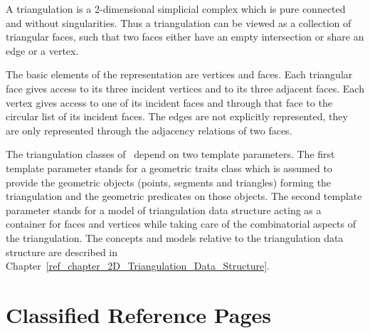 

A triangulation is a 2-dimensional simplicial complex which is pure
connected and without singularities. Thus a triangulation
can be viewed as a collection of triangular faces,
such that two faces either have an empty intersection or share an edge or a vertex.

The basic elements of the representation are vertices and faces.
Each triangular face gives access to its three incident vertices 
and to its three adjacent faces. 
Each vertex gives access to one of its incident faces
and through that face to the circular list of its incident faces.
The edges are not explicitly represented, they are only represented 
through the adjacency relations of two faces.

The triangulation classes of \cgal\ depend on two template parameters.
The first template parameter stands for
 a geometric traits class which is assumed to provide
the geometric objects (points, segments and triangles) 
forming  the triangulation and the geometric predicates on those objects.
The second template parameter stands for a model
of  triangulation data
structure acting as a container for faces and vertices
while  taking care of the combinatorial aspects of the triangulation. 
The concepts and models relative to the triangulation data structure
are described in
Chapter~\ref{ref_chapter_2D_Triangulation_Data_Structure}.

\section{Classified Reference Pages}

